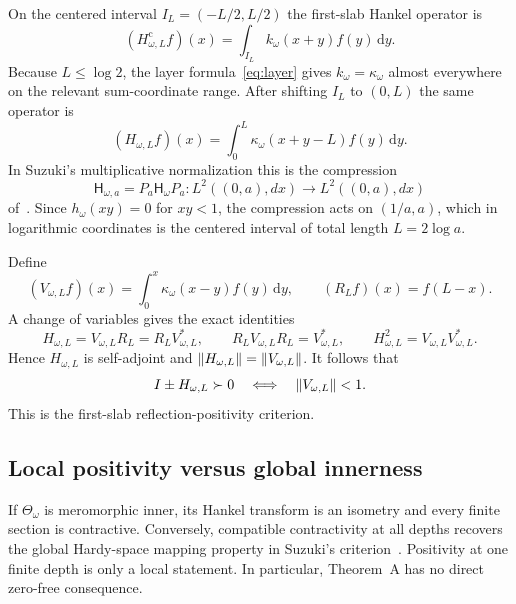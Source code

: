 \documentclass[11pt,a4paper]{article}
\newcommand{\dd}{\,\mathrm d}
\newcommand{\Hsf}{\mathsf H}
\DeclarePairedDelimiter{\norm}{\lVert}{\rVert}
\theoremstyle{plain}
\theoremstyle{definition}
\numberwithin{equation}{section}
\begin{document}
On the centered interval $I_L=(-L/2,L/2)$ the first-slab Hankel operator is
\begin{equation}
(H^{\mathrm c}_{\omega,L}f)(x)=\int_{I_L}k_\omega(x+y)f(y)\dd y .
\end{equation}
Because $L\le\log2$, the layer formula~\eqref{eq:layer} gives
$k_\omega=\kappa_\omega$ almost everywhere on the relevant sum-coordinate
range. After shifting $I_L$ to $(0,L)$ the same operator is
\begin{equation}
(H_{\omega,L}f)(x)=\int_0^L\kappa_\omega(x+y-L)f(y)\dd y .
\end{equation}
In Suzuki's multiplicative normalization this is the compression
\begin{equation}
\Hsf_{\omega,a}=P_a\Hsf_\omega P_a\colon L^2((0,a),dx)\to L^2((0,a),dx)
\end{equation}
of~\cite[eq.~(2.6)]{Suzuki2012}. Since $h_\omega(xy)=0$ for $xy<1$, the
compression acts on $(1/a,a)$, which in logarithmic coordinates is the
centered interval of total length $L=2\log a$.

Define
\begin{equation}
(V_{\omega,L}f)(x)=\int_0^x\kappa_\omega(x-y)f(y)\dd y,
\qquad
(R_Lf)(x)=f(L-x).
\end{equation}
A change of variables gives the exact identities
\begin{equation}\label{eq:volterra-identities}
H_{\omega,L}=V_{\omega,L}R_L=R_LV_{\omega,L}^{*},
\qquad
R_LV_{\omega,L}R_L=V_{\omega,L}^{*},
\qquad
H_{\omega,L}^{2}=V_{\omega,L}V_{\omega,L}^{*}.
\end{equation}
Hence $H_{\omega,L}$ is self-adjoint and $\norm{H_{\omega,L}}=\norm{V_{\omega,L}}$.
It follows that
\begin{equation}
I\pm H_{\omega,L}\succ0\quad\Longleftrightarrow\quad\norm{V_{\omega,L}}<1 .
\end{equation}
This is the first-slab reflection-positivity criterion.

\subsection{Local positivity versus global innerness}

If $\Theta_\omega$ is meromorphic inner, its Hankel transform is an isometry
\cite[Lemma~4.1]{Suzuki2012} and every finite section is contractive.
Conversely, compatible contractivity at all depths recovers the global
Hardy-space mapping property in Suzuki's criterion~\cite[Thm.~2.2]{Suzuki2012}.
Positivity at one finite depth is only a local statement. In particular,
Theorem~A has no direct zero-free consequence.
\end{document}
